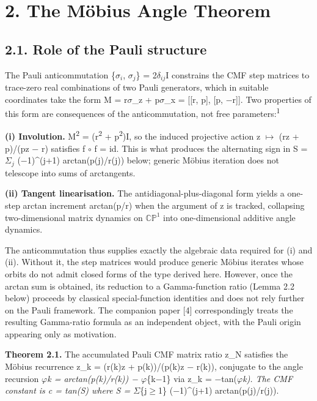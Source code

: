 \documentclass[11pt]{article}
\begin{document}
\hypertarget{the-muxf6bius-angle-theorem}{%
\section{2. The Möbius Angle
Theorem}\label{the-muxf6bius-angle-theorem}}

\hypertarget{role-of-the-pauli-structure}{%
\subsection{2.1. Role of the Pauli
structure}\label{role-of-the-pauli-structure}}

The Pauli anticommutation \{\(\sigma _{i}\), \(\sigma _{j}\)\} =
2\(\delta _{ij}\)I constrains the CMF step matrices to trace-zero real
combinations of two Pauli generators, which in suitable coordinates take
the form M = r\(\sigma\)\_z + p\(\sigma\)\_x = {[}{[}r, p{]}, {[}p,
−r{]}{]}. Two properties of this form are consequences of the
anticommutation, not free parameters:\textsuperscript{1}

\textbf{(i) Involution.} M\textsuperscript{2} = (r\textsuperscript{2} +
p\textsuperscript{2})I, so the induced projective action z \(\mapsto\)
(rz + p)/(pz − r) satisfies f \(\circ\) f = id. This is what produces
the alternating sign in S = \(\Sigma _{j}\) (−1)\^{}(j+1)
arctan(p(j)/r(j)) below; generic Möbius iteration does not telescope
into sums of arctangents.

\textbf{(ii) Tangent linearisation.} The antidiagonal-plus-diagonal form
yields a one-step arctan increment arctan(p/r) when the argument of z is
tracked, collapsing two-dimensional matrix dynamics on
\(\mathbb{C}\mathbb{P}^{1}\) into one-dimensional additive angle
dynamics.

The anticommutation thus supplies exactly the algebraic data required
for (i) and (ii). Without it, the step matrices would produce generic
Möbius iterates whose orbits do not admit closed forms of the type
derived here. However, once the arctan sum is obtained, its reduction to
a Gamma-function ratio (Lemma 2.2 below) proceeds by classical
special-function identities and does not rely further on the Pauli
framework. The companion paper {[}4{]} correspondingly treats the
resulting Gamma-ratio formula as an independent object, with the Pauli
origin appearing only as motivation.

\textbf{Theorem 2.1.} The accumulated Pauli CMF matrix ratio z\_N
satisfies the Möbius recurrence z\_k = (r(k)z + p(k))/(p(k)z − r(k)),
conjugate to the angle recursion \(\varphi\)\emph{k = arctan(p(k)/r(k))
− \(\varphi\)}\{k−1\} via z\_k = −tan(\(\varphi\)\emph{k). The CMF
constant is c = \textbar tan(S)\textbar{} where S =
\(\Sigma\)}\{j\(\geq\)1\} (−1)\^{}(j+1) arctan(p(j)/r(j)).
\end{document}

